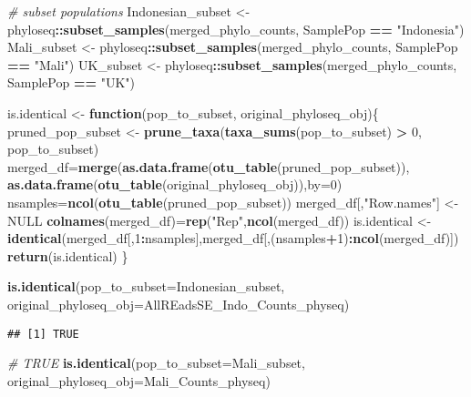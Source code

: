 \documentclass[]{article}
\newenvironment{Shaded}{\begin{snugshade}}{\end{snugshade}}
\newcommand{\CommentTok}[1]{\textcolor[rgb]{0.56,0.35,0.01}{\textit{#1}}}
\newcommand{\ControlFlowTok}[1]{\textcolor[rgb]{0.13,0.29,0.53}{\textbf{#1}}}
\newcommand{\DataTypeTok}[1]{\textcolor[rgb]{0.13,0.29,0.53}{#1}}
\newcommand{\DecValTok}[1]{\textcolor[rgb]{0.00,0.00,0.81}{#1}}
\newcommand{\KeywordTok}[1]{\textcolor[rgb]{0.13,0.29,0.53}{\textbf{#1}}}
\newcommand{\NormalTok}[1]{#1}
\newcommand{\OperatorTok}[1]{\textcolor[rgb]{0.81,0.36,0.00}{\textbf{#1}}}
\newcommand{\OtherTok}[1]{\textcolor[rgb]{0.56,0.35,0.01}{#1}}
\newcommand{\StringTok}[1]{\textcolor[rgb]{0.31,0.60,0.02}{#1}}
\begin{document}
\begin{Shaded}
\begin{Highlighting}[]
\CommentTok{# subset populations}
\NormalTok{Indonesian_subset <-}\StringTok{ }\NormalTok{phyloseq}\OperatorTok{::}\KeywordTok{subset_samples}\NormalTok{(merged_phylo_counts, SamplePop }\OperatorTok{==}\StringTok{ "Indonesia"}\NormalTok{)}
\NormalTok{Mali_subset <-}\StringTok{ }\NormalTok{phyloseq}\OperatorTok{::}\KeywordTok{subset_samples}\NormalTok{(merged_phylo_counts, SamplePop }\OperatorTok{==}\StringTok{ "Mali"}\NormalTok{)}
\NormalTok{UK_subset <-}\StringTok{ }\NormalTok{phyloseq}\OperatorTok{::}\KeywordTok{subset_samples}\NormalTok{(merged_phylo_counts, SamplePop }\OperatorTok{==}\StringTok{ "UK"}\NormalTok{)}

\NormalTok{is.identical <-}\StringTok{ }\ControlFlowTok{function}\NormalTok{(pop_to_subset, original_phyloseq_obj)\{}
\NormalTok{    pruned_pop_subset <-}\StringTok{ }\KeywordTok{prune_taxa}\NormalTok{(}\KeywordTok{taxa_sums}\NormalTok{(pop_to_subset) }\OperatorTok{>}\StringTok{ }\DecValTok{0}\NormalTok{, pop_to_subset)}
\NormalTok{    merged_df=}\KeywordTok{merge}\NormalTok{(}\KeywordTok{as.data.frame}\NormalTok{(}\KeywordTok{otu_table}\NormalTok{(pruned_pop_subset)), }\KeywordTok{as.data.frame}\NormalTok{(}\KeywordTok{otu_table}\NormalTok{(original_phyloseq_obj)),}\DataTypeTok{by=}\DecValTok{0}\NormalTok{)}
\NormalTok{    nsamples=}\KeywordTok{ncol}\NormalTok{(}\KeywordTok{otu_table}\NormalTok{(pruned_pop_subset))}
\NormalTok{    merged_df[,}\StringTok{"Row.names"}\NormalTok{] <-}\StringTok{ }\OtherTok{NULL}
    \KeywordTok{colnames}\NormalTok{(merged_df)=}\KeywordTok{rep}\NormalTok{(}\StringTok{"Rep"}\NormalTok{,}\KeywordTok{ncol}\NormalTok{(merged_df))}
\NormalTok{    is.identical <-}\StringTok{ }\KeywordTok{identical}\NormalTok{(merged_df[,}\DecValTok{1}\OperatorTok{:}\NormalTok{nsamples],merged_df[,(nsamples}\OperatorTok{+}\DecValTok{1}\NormalTok{)}\OperatorTok{:}\KeywordTok{ncol}\NormalTok{(merged_df)])}
    \KeywordTok{return}\NormalTok{(is.identical)}
\NormalTok{\}}

\KeywordTok{is.identical}\NormalTok{(}\DataTypeTok{pop_to_subset=}\NormalTok{Indonesian_subset, }\DataTypeTok{original_phyloseq_obj=}\NormalTok{AllREadsSE_Indo_Counts_physeq)}
\end{Highlighting}
\end{Shaded}

\begin{verbatim}
## [1] TRUE
\end{verbatim}

\begin{Shaded}
\begin{Highlighting}[]
\CommentTok{# TRUE}
\KeywordTok{is.identical}\NormalTok{(}\DataTypeTok{pop_to_subset=}\NormalTok{Mali_subset, }\DataTypeTok{original_phyloseq_obj=}\NormalTok{Mali_Counts_physeq)}
\end{Highlighting}
\end{Shaded}
\end{document}
